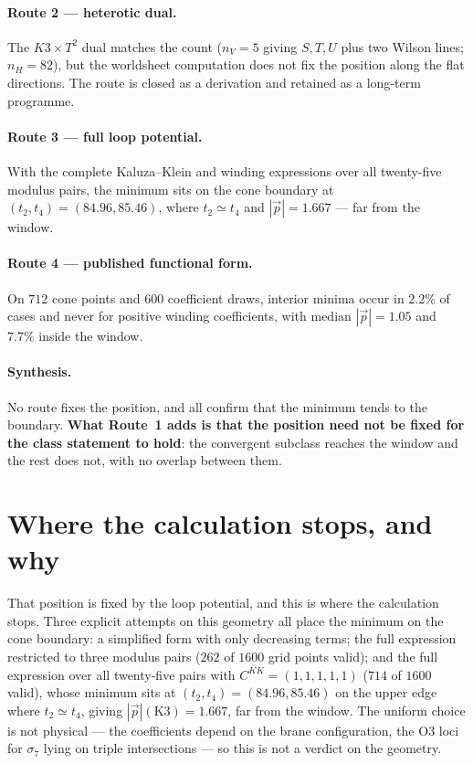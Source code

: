 \paragraph{Route 2 --- heterotic dual.} The $K3\times T^2$ dual matches the count ($n_V=5$ giving $S,T,U$ plus two Wilson lines; $n_H=82$), but the worldsheet computation does not fix the position along the flat directions. The route is closed as a derivation and retained as a long-term programme.
\paragraph{Route 3 --- full loop potential.} With the complete Kaluza--Klein and winding expressions over all twenty-five modulus pairs, the minimum sits on the cone boundary at $(t_2,t_4)=(84.96,85.46)$, where $t_2\simeq t_4$ and $|\vec p|=1.667$ --- far from the window.
\paragraph{Route 4 --- published functional form.} On $712$ cone points and $600$ coefficient draws, interior minima occur in $2.2\%$ of cases and never for positive winding coefficients, with median $|\vec p|=1.05$ and $7.7\%$ inside the window.
\paragraph{Synthesis.} No route fixes the position, and all confirm that the minimum tends to the boundary. \textbf{What Route~1 adds is that the position need not be fixed for the class statement to hold}: the convergent subclass reaches the window and the rest does not, with no overlap between them.

\section{Where the calculation stops, and why}
That position is fixed by the loop potential, and this is where the calculation stops. Three explicit attempts on this geometry all place the minimum on the cone boundary: a simplified form with only decreasing terms; the full expression restricted to three modulus pairs ($262$ of $1600$ grid points valid); and the full expression over all twenty-five pairs with $C^{KK}=(1,1,1,1,1)$ ($714$ of $1600$ valid), whose minimum sits at $(t_2,t_4)=(84.96,85.46)$ on the upper edge where $t_2\simeq t_4$, giving $|\vec p|(\mathrm{K3})=1.667$, far from the window. The uniform choice is not physical --- the coefficients depend on the brane configuration, the O3 loci for $\sigma_7$ lying on triple intersections --- so this is not a verdict on the geometry.

